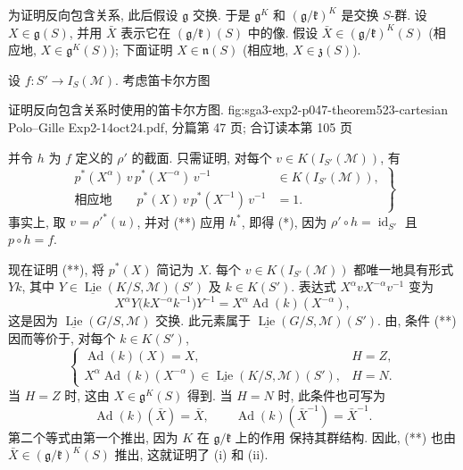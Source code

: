 为证明反向包含关系, 此后假设 \(\mathfrak g\) 交换.
于是 \(\mathfrak g^K\) 和 \((\mathfrak g/\mathfrak k)^K\) 是交换
\(S\)-群. 设 \(X\in\mathfrak g(S)\), 并用 \(\bar X\) 表示它在
\((\mathfrak g/\mathfrak k)(S)\) 中的像. 假设
\(\bar X\in(\mathfrak g/\mathfrak k)^K(S)\) (相应地,
\(X\in\mathfrak g^K(S)\)); 下面证明
\(X\in\mathfrak n(S)\) (相应地, \(X\in\mathfrak z(S)\)).

设 \(f:S'\to I_S(\mathscr M)\). 考虑笛卡尔方图

  {证明反向包含关系时使用的笛卡尔方图.}
  {fig:sga3-exp2-p047-theorem523-cartesian}
  {Polo--Gille Exp2-14oct24.pdf, 分篇第 47 页;
   合订读本第 105 页}

并令 \(h\) 为 \(f\) 定义的 \(\rho'\) 的截面. 只需证明,
对每个 \(v\in K(I_{S'}(\mathscr M))\), 有
\begin{equation}
 \left.
 \begin{aligned}
 p^*(X^\alpha)\,v\,p^*(X^{-\alpha})\,v^{-1}
     &\in K(I_{S'}(\mathscr M)),\\
 \text{相应地}\qquad
 p^*(X)\,v\,p^*(X^{-1})\,v^{-1}&=1.
 \end{aligned}
 \right\}
\tag{**}\label{sga3:ii:lemma:5-2-3-0:equation:double-star}
\end{equation}
事实上, 取 \(v=\rho'^*(u)\), 并对 (**) 应用 \(h^*\), 即得 (*),
因为 \(\rho'\circ h=\operatorname{id}_{S'}\) 且 \(p\circ h=f\).

现在证明 (**), 将 \(p^*(X)\) 简记为 \(X\).
每个 \(v\in K(I_{S'}(\mathscr M))\) 都唯一地具有形式 \(Yk\), 其中
\(Y\in\underline{\operatorname{Lie}}(K/S,\mathscr M)(S')\) 及
\(k\in K(S')\). 表达式
\(X^\alpha vX^{-\alpha}v^{-1}\) 变为
\[
 X^\alpha Y\bigl(kX^{-\alpha}k^{-1}\bigr)Y^{-1}
 =X^\alpha\operatorname{Ad}(k)(X^{-\alpha}),
\]
这是因为 \(\underline{\operatorname{Lie}}(G/S,\mathscr M)\) 交换.
此元素属于 \(\underline{\operatorname{Lie}}(G/S,\mathscr M)(S')\).
由, 条件 (**) 因而等价于,
对每个 \(k\in K(S')\),
\[
 \begin{cases}
 \operatorname{Ad}(k)(X)=X, & H=Z,\\
 X^\alpha\operatorname{Ad}(k)(X^{-\alpha})
   \in\underline{\operatorname{Lie}}(K/S,\mathscr M)(S'), & H=N.
 \end{cases}
\]
当 \(H=Z\) 时, 这由 \(X\in\mathfrak g^K(S)\) 得到.
当 \(H=N\) 时, 此条件也可写为
\begin{equation}
 \operatorname{Ad}(k)(\bar X)=\bar X,
 \qquad
 \operatorname{Ad}(k)(\bar X^{-1})=\bar X^{-1}.
\tag{*'}\label{sga3:ii:lemma:5-2-3-0:equation:star-prime}
\end{equation}
第二个等式由第一个推出, 因为 \(K\) 在 \(\mathfrak g/\mathfrak k\) 上的作用
保持其群结构. 因此, (**) 也由
\(\bar X\in(\mathfrak g/\mathfrak k)^K(S)\) 推出, 这就证明了 (i) 和 (ii).


